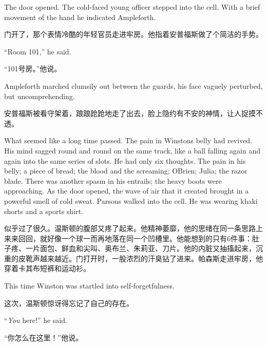 \begin{paracol}{2}
\switchcolumn*

The door opened. The cold-faced young officer stepped into the cell.
With a brief movement of the hand he indicated Ampleforth.

\switchcolumn

门开了，那个表情冷酷的年轻官员走进牢房。他指着安普福斯做了个简洁的手势。

\switchcolumn*

``Room 101,'' he said.

\switchcolumn

``101号房。''他说。

\switchcolumn*

Ampleforth marched clumsily out between the guards, his face vaguely
perturbed, but uncomprehending.

\switchcolumn

安普福斯被看守架着，踉踉跄跄地走了出去，脸上隐约有不安的神情，让人捉摸不透。

\switchcolumn*

What seemed like a long time passed. The pain in
Winston\textquotesingle s belly had revived. His mind sagged round and
round on the same track, like a ball falling again and again into the
same series of slots. He had only six thoughts. The pain in his belly; a
piece of bread; the blood and the screaming; O\textquotesingle Brien;
Julia; the razor blade. There was another spasm in his entrails; the
heavy boots were approaching. As the door opened, the wave of air that
it created brought in a powerful smell of cold sweat. Parsons walked
into the cell. He was wearing khaki shorts and a sports shirt.

\switchcolumn

似乎过了很久。温斯顿的腹部又疼了起来。他精神萎靡，他的思绪在同一条思路上来来回回，就好像一个球一而再地落在同一个凹槽里。他能想到的只有6件事：肚子疼、一片面包、鲜血和尖叫、奥布兰、朱莉亚、刀片。他的内脏又抽搐起来，沉重的皮靴声越来越近。门打开时，一股浓烈的汗臭钻了进来。帕森斯走进牢房，他穿着卡其布短裤和运动衫。

\switchcolumn*

This time Winston was startled into self-forgetfulness.

\switchcolumn

这次，温斯顿惊讶得忘记了自己的存在。

\switchcolumn*

``\emph{You} here!'' he said.

\switchcolumn

``你怎么在这里！''他说。


\end{paracol}
